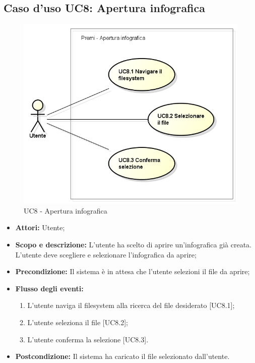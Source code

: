 \subsection{Caso d'uso UC8: Apertura infografica}
\begin{figure}[h] 
	\centering 
	\includegraphics[scale=0.45] {img/UC8.png} 
	\caption{UC8 - Apertura infografica} 
\end{figure}

\begin{itemize}
	\item \textbf{Attori:} Utente;
	\item \textbf{Scopo e descrizione:} L'utente ha scelto di aprire un'\gls{infografica} già creata. L'utente deve scegliere e selezionare l'\gls{infografica} da aprire;
	\item \textbf{Precondizione:} Il sistema è in attesa che l'utente selezioni il file da aprire;
	\item \textbf{Flusso degli eventi:}
	\begin{enumerate}
		\item L'utente naviga il \gls{filesystem} alla ricerca del file desiderato [UC8.1];
		\item L'utente seleziona il file [UC8.2];
		\item L'utente conferma la selezione [UC8.3].
	\end{enumerate}
	\item \textbf{Postcondizione:} Il sistema ha caricato il file selezionato dall'utente.
\end{itemize}

